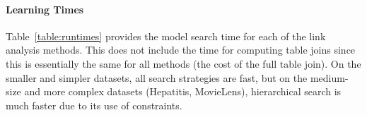 \documentclass{article}
\begin{document}
%
%




\paragraph{Learning Times} Table~\ref{table:runtimes}
 provides the model search time for each of the link analysis methods. This does not include the time for computing table joins since this is essentially the same for all methods (the cost of the full table join). On the smaller and simpler datasets, all search strategies are fast, 
but on the medium-size and more complex datasets (Hepatitis, MovieLens), hierarchical search is much faster due to its use of constraints.
\end{document}
